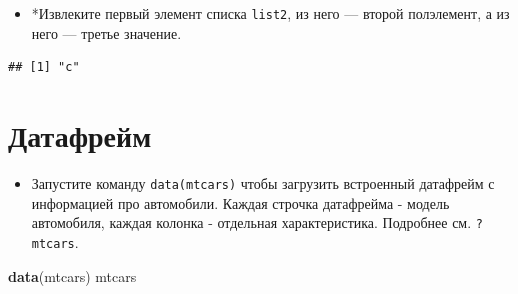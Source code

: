 \documentclass[]{book}
\newenvironment{Shaded}{\begin{snugshade}}{\end{snugshade}}
\newcommand{\KeywordTok}[1]{\textcolor[rgb]{0.13,0.29,0.53}{\textbf{#1}}}
\newcommand{\NormalTok}[1]{#1}
\providecommand{\tightlist}{%
  \setlength{\itemsep}{0pt}\setlength{\parskip}{0pt}}
\begin{document}
\begin{itemize}
\tightlist
\item
  *Извлеките первый элемент списка \texttt{list2}, из него --- второй
  полэлемент, а из него --- третье значение.
\end{itemize}

\begin{verbatim}
## [1] "c"
\end{verbatim}

\section{Датафрейм}\label{task_df}

\begin{itemize}
\tightlist
\item
  Запустите команду \texttt{data(mtcars)} чтобы загрузить встроенный
  датафрейм с информацией про автомобили. Каждая строчка датафрейма -
  модель автомобиля, каждая колонка - отдельная характеристика.
  Подробнее см. \texttt{?mtcars}.
\end{itemize}

\begin{Shaded}
\begin{Highlighting}[]
\KeywordTok{data}\NormalTok{(mtcars)}
\NormalTok{mtcars}
\end{Highlighting}
\end{Shaded}
\end{document}
